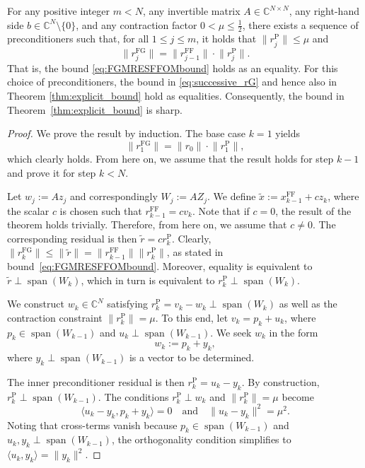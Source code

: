 \documentclass{siamart251216}
\DeclareMathOperator{\spn}{span}
\def\C{\mathbb{C}}
\begin{document}
{\begin{theorem}  \label{thm:sharpness}
    For any positive integer $m < N$, any invertible matrix $A \in \C^{N \times N}$, any right-hand side $b \in \C^N \setminus \{0\}$, and any contraction factor $0 < \mu \leq \frac{1}{2}$, there exists a sequence of preconditioners such that, for all $1 \leq j \leq m$, it holds that $\|r_j^{\mathrm{P}}\| \leq \mu$ and $$\big\| r_j^{\mathrm{FG}} \big\| = \big\| r_{j-1}^{\mathrm{FF}} \big\| \cdot \big\| r_{j}^{\mathrm{P}} \big\|.$$ 
    That is, the bound \eqref{eq:FGMRESFFOMbound} holds as an equality. For this choice of preconditioners, the bound in \eqref{eq:successive_rG} and hence also in Theorem \ref{thm:explicit_bound} hold as equalities. Consequently, the bound in Theorem~\ref{thm:explicit_bound} is sharp.
\end{theorem}

\begin{proof}
    We prove the result by induction. The base case $k=1$ yields $$\big\| r_1^{\mathrm{FG}} \big\| = \big\| r_0 \big\| \cdot \big\| r_{1}^{\mathrm{P}} \big\|,$$ which clearly holds. From here on, we assume that the result holds for step $k-1$ and prove it for step $k < N$.

    Let $w_j := A z_j$ and correspondingly $W_j := A Z_j$. We define $\tilde x := x_{k-1}^{\mathrm{FF}} + c z_k$, where the scalar $c$ is chosen such that $r_{k-1}^{\mathrm{FF}} = c v_k$. Note that if $c=0$, the result of the theorem holds trivially. Therefore, from here on, we assume that $c \neq 0$. The corresponding residual is then $\tilde r = c r_k^{\mathrm{P}}.$ Clearly, $\|r_k^{\mathrm{FG}}\| \leq \|\tilde r\| = \|r_{k-1}^{\mathrm{FF}}\| \|r_k^{\mathrm{P}}\|$, as stated in bound~\eqref{eq:FGMRESFFOMbound}. Moreover, equality is equivalent to $\tilde r \perp \spn(W_k)$, which in turn is equivalent to $r_k^{\mathrm{P}} \perp \spn(W_k).$

    We construct $w_k \in \C^N$ satisfying $r_k^{\mathrm{P}} = v_k - w_k \perp \spn(W_k)$ as well as the contraction constraint $\|r_k^{\mathrm{P}}\| = \mu$. To this end, let $v_k = p_k + u_k$, where $p_k \in \spn(W_{k-1})$ and $u_k \perp \spn(W_{k-1})$. We seek $w_k$ in the form $$ w_k := p_k + y_k,$$ where $y_k \perp \spn(W_{k-1})$ is a vector to be determined.

    The inner preconditioner residual is then $r_k^{\mathrm{P}} = u_k - y_k$. By construction, $r_k^{\mathrm{P}} \perp \spn(W_{k-1})$. The conditions $r_k^{\mathrm{P}} \perp w_k$ and $\|r_k^{\mathrm{P}}\| = \mu$ become
    $$ \langle u_k - y_k, p_k + y_k \rangle = 0 \quad \text{and} \quad \|u_k - y_k\|^2 = \mu^2.$$
    Noting that cross-terms vanish because $p_k \in \spn(W_{k-1})$ and $u_k, y_k \perp \spn(W_{k-1})$, the orthogonality condition simplifies to $\langle u_k, y_k \rangle = \|y_k\|^2$.


\end{proof}}
\end{document}
